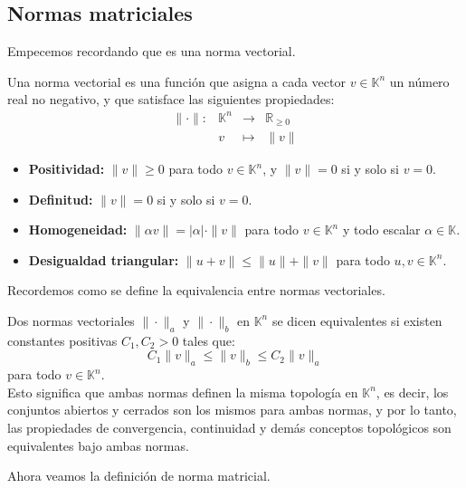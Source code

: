 \subsection{Normas matriciales}

Empecemos recordando que es una norma vectorial.

\begin{definición}
    Una norma vectorial es una función que asigna a cada vector $ v \in \mathbb{K}^n $ un número real no negativo, y que satisface las siguientes propiedades:
    \[
        \begin{array}{rccl}
            \| \cdot \| : & \mathbb{K}^n & \to & \mathbb{R}_{\geq 0} \\
            & v & \mapsto & \|v\|
        \end{array}
    \]
    \begin{itemize}
        \item \textbf{Positividad:} $ \|v\| \geq 0 $ para todo $ v \in \mathbb{K}^n $, y $ \|v\| = 0 $ si y solo si $ v = 0 $.
        \item \textbf{Definitud:} $ \|v\| = 0 $ si y solo si $ v = 0 $.
        \item \textbf{Homogeneidad:} $ \|\alpha v\| = |\alpha| \cdot \|v\| $ para todo $ v \in \mathbb{K}^n $ y todo escalar $ \alpha \in \mathbb{K} $.
        \item \textbf{Desigualdad triangular:} $ \|u + v\| \leq \|u\| + \|v\| $ para todo $ u, v \in \mathbb{K}^n $.
    \end{itemize}
\end{definición}

Recordemos como se define la equivalencia entre normas vectoriales.

\begin{definición}
    Dos normas vectoriales $ \|\cdot\|_a $ y $ \|\cdot\|_b $ en $ \mathbb{K}^n $ se dicen equivalentes si existen constantes positivas $ C_1, C_2 > 0 $ tales que:
    \[
        C_1 \|v\|_a \leq \|v\|_b \leq C_2 \|v\|_a
    \]
    para todo $ v \in \mathbb{K}^n $.\\
    Esto significa que ambas normas definen la misma topología en $ \mathbb{K}^n $, es decir, los conjuntos abiertos y cerrados son los mismos para ambas normas, y por lo tanto, las propiedades de convergencia, continuidad y demás conceptos topológicos son equivalentes bajo ambas normas.
\end{definición}

Ahora veamos la definición de norma matricial.

